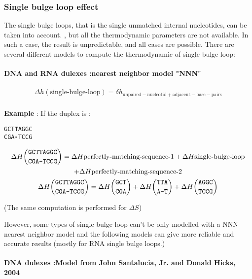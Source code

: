 \documentclass{article}
\begin{document}
\subsubsection{Single bulge loop effect}

The single bulge loops, that is the single unmatched internal nucleotides, can be taken into
account. , but all the thermodynamic parameters are not available. In such a case, 
the result is unpredictable, and all cases are possible. 
There are several different models to compute the thermodynamic of single bulge loop:

\paragraph{DNA and RNA dulexes :\textbf{nearest neighbor model "NNN"}} 

\begin{multline*}
\Delta h {(\mbox{single-bulge-loop})} =
\delta{}h_\mathrm{unpaired-nucleotid+adjacent-base-pairs} \\
\end{multline*}

\textbf{Example} :
If the duplex is :
\begin{alltt}
GCT\textbf{T}AGGC
CGA\textbf{-}TCCG
\end{alltt}
\begin{multline*}
\Delta H {\mbox{\texttt{GCTTAGGC}} \choose \mbox{\texttt{CGA-TCCG}}} =
\Delta H {\mbox{perfectly-matching-sequence-1}} +
\Delta H {\mbox{single-bulge-loop}} \\ +
\Delta H {\mbox{perfectly-matching-sequence-2}}\\
\Delta H {\mbox{\texttt{GCTTAGGC}} \choose \mbox{\texttt{CGA-TCCG}}} =
\Delta H {\mbox{\texttt{GCT}} \choose \mbox{\texttt{CGA}}} +
\Delta H {\mbox{\texttt{TTA}} \choose \mbox{\texttt{A-T}}} +
\Delta H {\mbox{\texttt{AGGC}} \choose \mbox{\texttt{TCCG}}}\\
\end{multline*}

       (The same computation is performed for $\Delta S$)   
  
 However, some types of single bulge loop can't be only modelled with a NNN nearest 
 neighbor model and the following models can give more reliable and accurate results (mostly
 for RNA single bulge loops.)  
  
\paragraph{DNA dulexes :\textbf{Model from John Santalucia, Jr. and Donald Hicks, 2004}} 
\end{document}
